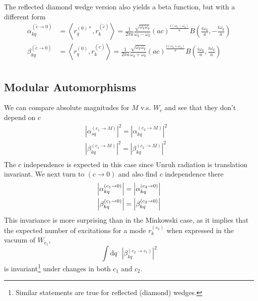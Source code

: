 \documentclass[12pt,a4paper]{article}
\newcommand{\dv}[1]{\mathrm{d} #1 \text{ }}
\begin{document}
The reflected diamond wedge version also yields a beta function, but with a different form
\begin{equation}
  \begin{aligned}
    \alpha^{(\widetilde{c} \rightarrow 0)}_{kq}     &= \left<r_q^{(0)*}, r_k^{(\widetilde{c})} \right> = \frac{1}{2 \pi a}\frac{\sqrt{\omega_k \omega_q}}{\omega_q - \omega_k} (ac)^{\frac{i(\omega_k - \omega_q)}{a}} B\left(\frac{i\omega_k}{a}, -\frac{i\omega_q}{a}\right) \\
    \beta^{(\widetilde{c} \rightarrow 0)}_{kq} &= \left<r_q^{(0)}, r_k^{(\widetilde{c})} \right> = \frac{1}{2 \pi a}\frac{\sqrt{\omega_k \omega_q}}{\omega_q + \omega_k} (ac)^{\frac{i(\omega_k + \omega_q)}{a}} B\left(\frac{i\omega_k}{a}, \frac{i\omega_q}{a}\right) \\
  \end{aligned}
  \label{bogoTC0}
\end{equation}

\subsection{Modular Automorphisms} \label{sec:mod}

We can compare absolute magnitudes for $M$ v.s. $W_c$ and see that they don't depend on $c$
\begin{equation}
  \begin{array}{cc}
    \left|\alpha_{sq}^{(c_1 \rightarrow M)}\right|^2 = \left|\alpha_{kq}^{(c_2 \rightarrow M)}\right|^2 & \\
    \left|\beta_{kq}^{(c_1 \rightarrow M)}\right|^2 = \left|\beta_{kq}^{(c_2 \rightarrow M)}\right|^2 & \\
 \end{array}
\end{equation}
The $c$ independence is expected in this case since Unruh radiation is translation invariant. We next turn to $(c \rightarrow 0)$ and also find $c$ independence there 
\begin{equation}
  \begin{array}{c}
    \left|\alpha_{kq}^{(c_1 \rightarrow 0)}\right| = \left|\alpha_{kq}^{(c_2 \rightarrow 0)}\right| \vspace{4pt} \\
    \left|\beta_{kq}^{(c_1 \rightarrow 0)}\right| = \left|\beta_{kq}^{(c_2 \rightarrow 0)}\right| \\
  \end{array}
\end{equation}
This invariance is more surprising than in the Minkowski case, as it implies that the expected number of excitations for a mode $r_k^{(c_2)}$ when expressed in the vacuum of $W_{c_1}$,
\begin{equation}
  \int \dv{q} |\beta^{(c_2 \rightarrow c_1)}_{kq}|^2
\end{equation}
is invariant\footnote{Similar statements are true for reflected (diamond) wedges.} under changes in both $c_1$ and $c_2$.
\end{document}
